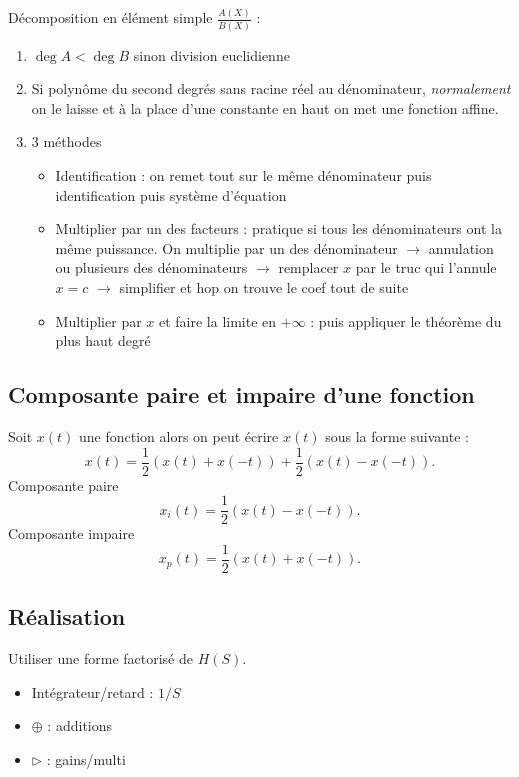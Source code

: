\documentclass[9pt]{article}
\begin{document}
\begin{multicols}{2}
Décomposition en élément simple $ \frac{A(X)}{B(X)} $ : \begin{enumerate}
    \item $ \deg A < \deg B $ sinon division euclidienne
    \item Si polynôme du second degrés sans racine réel au dénominateur, \textit{normalement} on le laisse et à la place d'une constante en haut on met une fonction affine. 
    \item 3 méthodes \begin{itemize}
        \item Identification : on remet tout sur le même dénominateur puis identification puis système d'équation
        \item Multiplier par un des facteurs : pratique si tous les dénominateurs ont la même puissance. On multiplie par un des dénominateur $\rightarrow$ annulation ou plusieurs des dénominateurs $\rightarrow$ remplacer $ x $ par le truc qui l'annule $ x=c $ $\rightarrow$ simplifier et hop on trouve le coef tout de suite
        \item Multiplier par $ x $  et faire la limite en $ +\infty  $  : puis appliquer le théorème du plus haut degré
    \end{itemize}
\end{enumerate}

\subsection{Composante paire et impaire d'une fonction}
Soit $ x(t) $ une fonction alors on peut écrire $ x(t) $ sous la forme suivante : 
\[
    x(t) = \frac{1}{2}(x(t) + x(-t)) + \frac{1}{2}(x(t) - x(-t))
.\]
Composante paire 
\[
    x_i(t) = \frac{1}{2}(x(t) - x(-t))
.\]
Composante impaire 
\[
    x_p(t) = \frac{1}{2}(x(t) + x(-t))
.\]
\subsection{Réalisation}
Utiliser une forme factorisé de $ H(S) $. \begin{itemize}
    \item Intégrateur/retard : $ 1/S $ 
    \item $ \oplus $ : additions
    \item $ \rhd $ : gains/multi
\end{itemize}


\end{multicols}
\end{document}
